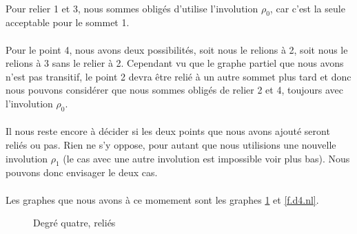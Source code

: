 \paragraph{}
Pour relier 1 et 3, nous sommes obligés d'utilise l'involution $\rho_0$, car c'est la seule acceptable pour le sommet 1.

\paragraph{}
Pour le point 4, nous avons deux possibilités, soit nous le relions à 2, soit nous le relions à 3 sans le relier à 2. Cependant vu que le graphe partiel que nous avons n'est pas transitif, le point 2 devra être relié à un autre sommet plus tard et donc nous pouvons considérer que nous sommes obligés de relier 2 et 4, toujours avec l'involution $\rho_0$.

\paragraph{}
Il nous reste encore à décider si les deux points que nous avons ajouté seront reliés ou pas. Rien ne s'y oppose, pour autant que nous utilisions une nouvelle involution $\rho_1$ (le cas avec une autre involution est impossible voir plus bas). Nous pouvons donc envisager le deux cas.

\paragraph{}
Les graphes que nous avons à ce momement sont les graphes \ref{f.d4.l} et \ref{f.d4.nl}.

\begin{figure}[H]
  \begin{center}
  \end{center}
  \caption{Degré quatre, reliés}
  \label{f.d4.l}
\end{figure}


